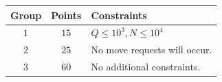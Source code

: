 \begin{center}
\begin{tabular}{| c | c | p{12cm} |}
  \hline
  \textbf{Group} & \textbf{Points} & \textbf{Constraints} \\ \hline
  $1$    & $15$  & $Q \le 10^3, N \le 10^4$ \\ \hline
  $2$    & $25$  & No move requests will occur. \\ \hline
  $3$    & $60$  & No additional constraints. \\ \hline
\end{tabular}
\end{center}
